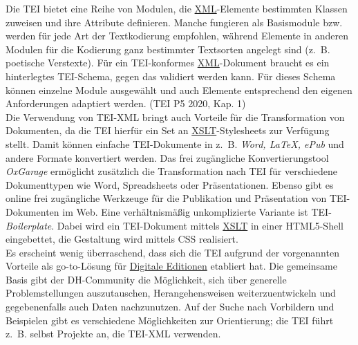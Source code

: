 \documentclass{article}
\begin{document}
        Die TEI bietet eine Reihe von Modulen, die \href{http://gams.uni-graz.at/o:konde.215}{XML}-Elemente bestimmten Klassen zuweisen und ihre Attribute definieren. Manche fungieren als Basismodule bzw. werden für jede Art der Textkodierung empfohlen, während Elemente in anderen Modulen für die Kodierung ganz bestimmter Textsorten angelegt sind (z. B. poetische Verstexte). Für ein TEI-konformes \href{http://gams.uni-graz.at/o:konde.215}{XML}-Dokument braucht es ein hinterlegtes TEI-Schema, gegen das validiert werden kann. Für dieses Schema können einzelne Module ausgewählt und auch Elemente entsprechend den eigenen Anforderungen adaptiert werden. (TEI P5 2020, Kap. 1)\\
            
        Die Verwendung von TEI-XML bringt auch Vorteile für die Transformation von Dokumenten, da die TEI hierfür ein Set an \href{http://gams.uni-graz.at/o:konde.86}{XSLT}-Stylesheets zur Verfügung stellt. Damit können einfache TEI-Dokumente in z. B. \emph{Word, LaTeX, ePub} und andere Formate konvertiert werden. Das frei zugängliche Konvertierungstool \emph{OxGarage} ermöglicht zusätzlich die Transformation nach TEI für verschiedene Dokumenttypen wie Word, Spreadsheets oder Präsentationen. Ebenso gibt es online frei zugängliche Werkzeuge für die Publikation und Präsentation von TEI-Dokumenten im Web. Eine verhältnismäßig unkomplizierte Variante ist TEI-\emph{Boilerplate}. Dabei wird ein TEI-Dokument mittels \href{http://gams.uni-graz.at/o:konde.86}{XSLT} in einer HTML5-Shell eingebettet, die Gestaltung wird mittels CSS realisiert.\\
            
        Es erscheint wenig überraschend, dass sich die TEI aufgrund der vorgenannten Vorteile als go-to-Lösung für \href{http://gams.uni-graz.at/o:konde.59}{Digitale Editionen} etabliert hat. Die gemeinsame Basis gibt der DH-Community die Möglichkeit, sich über generelle Problemstellungen auszutauschen, Herangehensweisen weiterzuentwickeln und gegebenenfalls auch Daten nachzunutzen. Auf der Suche nach Vorbildern und Beispielen gibt es verschiedene Möglichkeiten zur Orientierung; die TEI führt z. B. selbst Projekte an, die TEI-XML verwenden.\\
            
\end{document}
